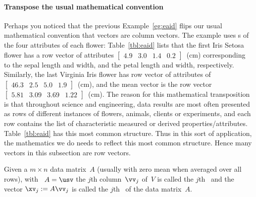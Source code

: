 \paragraph{Transpose the usual mathematical convention}
Perhaps you noticed that the previous Example~\ref{eg:eaid} flips our usual mathematical convention that vectors are column vectors.
The example uses s of the four attributes of each flower: 
Table~\ref{tbl:eaid} lists that the first Iris Setosa flower has a row vector of attributes \(\begin{bmatrix} 4.9&3.0&1.4&0.2 \end{bmatrix}\)~(cm) corresponding to the sepal length and width, and the petal length and width, respectively.
Similarly, the last Virginia Iris flower has row vector of attributes of \(\begin{bmatrix} 46.3&2.5&5.0&1.9 \end{bmatrix}\)~(cm), and the mean vector is the row vector \(\begin{bmatrix} 5.81&3.09&3.69&1.22 \end{bmatrix}\)~(cm).
The reason for this mathematical transposition is that throughout science and engineering, data results are most often presented as rows of different instances of flowers, animals, clients or experiments, and each row contains the list of characteristic measured or derived properties\slash attributes.
Table~\ref{tbl:eaid} has this most common structure.
Thus in this sort of application, the mathematics we do needs to reflect this most common structure.
Hence many vectors in this subsection are row vectors.




\begin{definition} \label{def:}
Given a \(m\times n\) data matrix~\(A\) (usually with zero mean when averaged over all rows),  with  \svd\ \(A=\usv\) the \(j\)th column~\(\vv_j\) of~\(V\) is called the \(j\)th~ and the vector \(\xv_j:=A\vv_j\) is called the \(j\)th~ of the data matrix~\(A\).
\end{definition}



